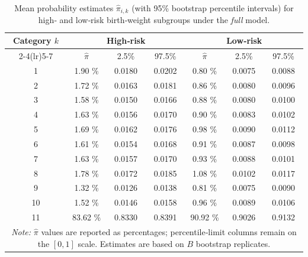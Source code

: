 \begin{table}[H]
\centering
\caption[Mean Probability Estimates With 95\% Bootstrap Percentile Intervals for for High- and Low-Risk Birth-Weight Subgroups Under the Full Model]{Mean probability estimates $\hat{\pi}_{i,k}$ (with 95\% bootstrap percentile intervals) for high‑ and low‑risk birth‑weight subgroups under the \emph{full} model.}
\label{tab:pi_mean_full}
\begin{tabular}{ccccccc}
\toprule
\multirow{2}{*}{Category $k$} & \multicolumn{3}{c}{High‑risk} & \multicolumn{3}{c}{Low‑risk} \\
\cmidrule(lr){2-4}\cmidrule(lr){5-7}
 & $\hat{\pi}$ & 2.5\% & 97.5\% & $\hat{\pi}$ & 2.5\% & 97.5\% \\
\midrule
1  & 1.90 \% & 0.0180 & 0.0202 & 0.80 \% & 0.0075 & 0.0088 \\
2  & 1.72 \% & 0.0163 & 0.0181 & 0.86 \% & 0.0080 & 0.0096 \\
3  & 1.58 \% & 0.0150 & 0.0166 & 0.88 \% & 0.0080 & 0.0100 \\
4  & 1.63 \% & 0.0156 & 0.0170 & 0.90 \% & 0.0083 & 0.0102 \\
5  & 1.69 \% & 0.0162 & 0.0176 & 0.98 \% & 0.0090 & 0.0112 \\
6  & 1.61 \% & 0.0154 & 0.0168 & 0.91 \% & 0.0087 & 0.0098 \\
7  & 1.63 \% & 0.0157 & 0.0170 & 0.93 \% & 0.0088 & 0.0101 \\
8  & 1.78 \% & 0.0172 & 0.0185 & 1.08 \% & 0.0102 & 0.0117 \\
9  & 1.32 \% & 0.0126 & 0.0138 & 0.81 \% & 0.0075 & 0.0090 \\
10 & 1.52 \% & 0.0146 & 0.0158 & 0.96 \% & 0.0089 & 0.0106 \\
11 & 83.62 \% & 0.8330 & 0.8391 & 90.92 \% & 0.9026 & 0.9132 \\
\bottomrule
\multicolumn{7}{p{0.9\textwidth}}{\textit{Note:} $\hat{\pi}$ values are reported as percentages; percentile‑limit columns remain on the \([0,1]\) scale.  Estimates are based on $B$ bootstrap replicates.}\\
\end{tabular}
\end{table}


